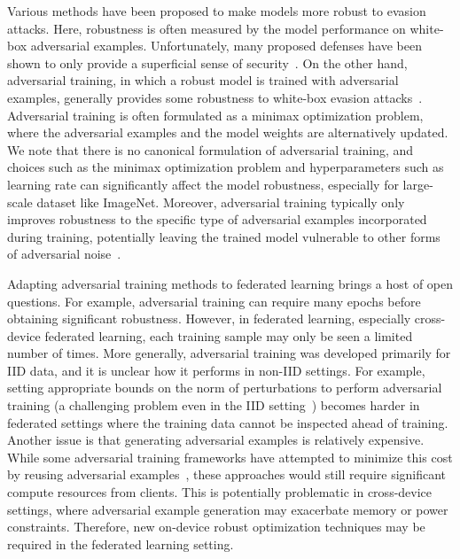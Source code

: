 Various methods have been proposed to make models more robust to evasion attacks. Here, robustness is often measured by the model performance on white-box adversarial examples.
Unfortunately, many proposed defenses have been shown to only provide a superficial sense of security~\cite{athalye2018obfuscated}.  
On the other hand, adversarial training, in which a robust model is trained with adversarial examples, generally provides some robustness to white-box evasion attacks~\cite{madry2017towards, xie2018feature, shafahi2018free}.
Adversarial training is often formulated as a minimax optimization problem, where the adversarial examples and the model weights are alternatively updated. We note that there is no canonical formulation of adversarial training, and choices such as the minimax optimization problem and hyperparameters such as learning rate can significantly affect the model robustness, especially for large-scale dataset like ImageNet. Moreover, adversarial training typically only improves robustness to the specific type of adversarial examples incorporated during training, potentially leaving the trained model vulnerable to other forms of adversarial noise~\cite{engstrom2017rotation, tramer2019adversarial, sharma2017attacking}.

Adapting adversarial training methods to federated learning brings a host of open questions. For example, adversarial training can require many epochs before obtaining significant robustness. However, in federated learning, especially cross-device federated learning, each training sample may only be seen a limited number of times. More generally, adversarial training was developed primarily for IID data, and it is unclear how it performs in non-IID settings. For example, setting appropriate bounds on the norm of perturbations to perform adversarial training (a challenging problem even in the IID setting~\cite{DBLP:conf/icml/TramerBCPJ20}) becomes harder in federated settings where the training data cannot be inspected ahead of training.
Another issue is that generating adversarial examples is relatively expensive. While some adversarial training frameworks have attempted to minimize this cost by reusing adversarial examples~\cite{shafahi2018free}, these approaches would still require significant compute resources from clients. This is potentially problematic in cross-device settings, where adversarial example generation may exacerbate memory or power constraints. Therefore, new on-device robust optimization techniques may be required in the federated learning setting. 

